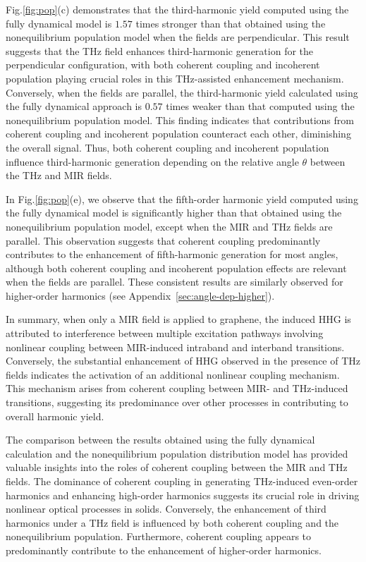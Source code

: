 Fig.\ref{fig:pop}(c) demonstrates that the third-harmonic yield computed using the fully dynamical model is $1.57$ times stronger than that obtained using the nonequilibrium population model when the fields are perpendicular. This result suggests that the THz field enhances third-harmonic generation for the perpendicular configuration, with both coherent coupling and incoherent population playing crucial roles in this THz-assisted enhancement mechanism. Conversely, when the fields are parallel, the third-harmonic yield calculated using the fully dynamical approach is $0.57$ times weaker than that computed using the nonequilibrium population model. This finding indicates that contributions from coherent coupling and incoherent population counteract each other, diminishing the overall signal. Thus, both coherent coupling and incoherent population influence third-harmonic generation depending on the relative angle $\theta$ between the THz and MIR fields.

In Fig.\ref{fig:pop}(e), we observe that the fifth-order harmonic yield computed using the fully dynamical model is significantly higher than that obtained using the nonequilibrium population model, except when the MIR and THz fields are parallel. This observation suggests that coherent coupling predominantly contributes to the enhancement of fifth-harmonic generation for most angles, although both coherent coupling and incoherent population effects are relevant when the fields are parallel. These consistent results are similarly observed for higher-order harmonics (see Appendix~\ref{sec:angle-dep-higher}).

In summary, when only a MIR field is applied to graphene, the induced HHG is attributed to interference between multiple excitation pathways involving nonlinear coupling between MIR-induced intraband and interband transitions. Conversely, the substantial enhancement of HHG observed in the presence of THz fields indicates the activation of an additional nonlinear coupling mechanism. This mechanism arises from coherent coupling between MIR- and THz-induced transitions, suggesting its predominance over other processes in contributing to overall harmonic yield.

The comparison between the results obtained using the fully dynamical calculation and the nonequilibrium population distribution model has provided valuable insights into the roles of coherent coupling between the MIR and THz fields. The dominance of coherent coupling in generating THz-induced even-order harmonics and enhancing high-order harmonics suggests its crucial role in driving nonlinear optical processes in solids. Conversely, the enhancement of third harmonics under a THz field is influenced by both coherent coupling and the nonequilibrium population. Furthermore, coherent coupling appears to predominantly contribute to the enhancement of higher-order harmonics.

